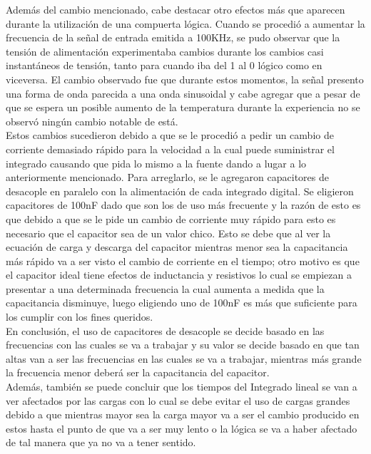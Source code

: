 \documentclass{report}
\begin{document}
Además del cambio mencionado, cabe destacar otro efectos más que aparecen durante la utilización de una compuerta lógica. Cuando se procedió a aumentar la frecuencia de la señal de entrada emitida a 100KHz, se pudo observar que la tensión de alimentación experimentaba cambios durante los cambios casi instantáneos de tensión, tanto para cuando iba del 1 al 0 lógico como en viceversa. El cambio observado fue que durante estos momentos, la señal presento una forma de onda parecida a una onda sinusoidal y cabe agregar que a pesar de que se espera un posible aumento de la temperatura durante la experiencia no se observó ningún cambio notable de está.\\
Estos cambios sucedieron debido a que se le procedió a pedir un cambio de corriente demasiado rápido para la velocidad a la cual puede suministrar el integrado causando que pida lo mismo a la fuente dando a lugar a lo anteriormente mencionado. Para arreglarlo, se le agregaron capacitores de desacople en paralelo con la alimentación de cada integrado digital. Se eligieron capacitores de 100nF dado que son los de uso más frecuente y la razón de esto es que debido a que se le pide un cambio de corriente muy rápido para esto es necesario que el capacitor sea de un valor chico. Esto se debe que al ver la ecuación de carga y descarga del capacitor mientras menor sea la capacitancia más rápido va a ser visto el cambio de corriente en el tiempo; otro motivo es que el capacitor ideal tiene efectos de inductancia y resistivos lo cual se empiezan a presentar a una determinada frecuencia la cual aumenta a medida que la capacitancia disminuye, luego eligiendo uno de 100nF es más que suficiente para los cumplir con los fines queridos.\\
En conclusión, el uso de capacitores de desacople se decide basado en las frecuencias con las cuales se va a trabajar y su valor se decide basado en que tan altas van a ser las frecuencias en las cuales se va a trabajar, mientras más grande la frecuencia menor deberá ser la capacitancia del capacitor.\\
Además, también se puede concluir que los tiempos del Integrado lineal se van a ver afectados por las cargas con lo cual se debe evitar el uso de cargas grandes debido a que mientras mayor sea la carga mayor va a ser el cambio producido en estos hasta el punto de que va a ser muy lento o la lógica se va a haber afectado de tal manera que ya no va a tener sentido.\\
\end{document}

